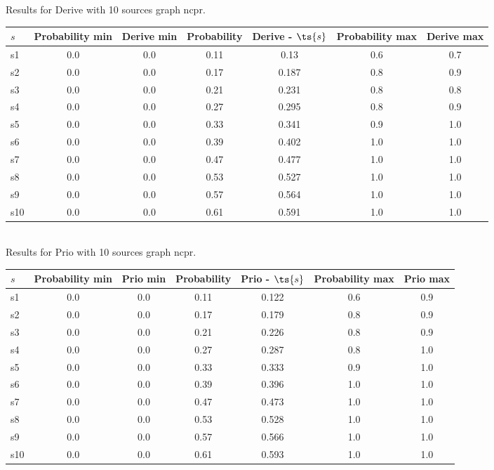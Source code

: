 \documentclass{article}
\begin{document}
\noindent Results for Derive with 10 sources graph ncpr.

\noindent\begin{tabular}{|l|c|c|c|c|c|c|}
\hline
$s$& Probability min & Derive min & Probability & Derive - $\ts{s}$ & Probability max & Derive max\\
\hline
s1 &0.0 & 0.0 & 0.11 & 0.13 & 0.6 & 0.7\\
\hline
s2 &0.0 & 0.0 & 0.17 & 0.187 & 0.8 & 0.9\\
\hline
s3 &0.0 & 0.0 & 0.21 & 0.231 & 0.8 & 0.8\\
\hline
s4 &0.0 & 0.0 & 0.27 & 0.295 & 0.8 & 0.9\\
\hline
s5 &0.0 & 0.0 & 0.33 & 0.341 & 0.9 & 1.0\\
\hline
s6 &0.0 & 0.0 & 0.39 & 0.402 & 1.0 & 1.0\\
\hline
s7 &0.0 & 0.0 & 0.47 & 0.477 & 1.0 & 1.0\\
\hline
s8 &0.0 & 0.0 & 0.53 & 0.527 & 1.0 & 1.0\\
\hline
s9 &0.0 & 0.0 & 0.57 & 0.564 & 1.0 & 1.0\\
\hline
s10 &0.0 & 0.0 & 0.61 & 0.591 & 1.0 & 1.0\\
\hline
\end{tabular}\\

\noindent Results for Prio with 10 sources graph ncpr.

\noindent\begin{tabular}{|l|c|c|c|c|c|c|}
\hline
$s$& Probability min & Prio min & Probability & Prio - $\ts{s}$ & Probability max & Prio max\\
\hline
s1 &0.0 & 0.0 & 0.11 & 0.122 & 0.6 & 0.9\\
\hline
s2 &0.0 & 0.0 & 0.17 & 0.179 & 0.8 & 0.9\\
\hline
s3 &0.0 & 0.0 & 0.21 & 0.226 & 0.8 & 0.9\\
\hline
s4 &0.0 & 0.0 & 0.27 & 0.287 & 0.8 & 1.0\\
\hline
s5 &0.0 & 0.0 & 0.33 & 0.333 & 0.9 & 1.0\\
\hline
s6 &0.0 & 0.0 & 0.39 & 0.396 & 1.0 & 1.0\\
\hline
s7 &0.0 & 0.0 & 0.47 & 0.473 & 1.0 & 1.0\\
\hline
s8 &0.0 & 0.0 & 0.53 & 0.528 & 1.0 & 1.0\\
\hline
s9 &0.0 & 0.0 & 0.57 & 0.566 & 1.0 & 1.0\\
\hline
s10 &0.0 & 0.0 & 0.61 & 0.593 & 1.0 & 1.0\\
\hline
\end{tabular}\\
\end{document}
